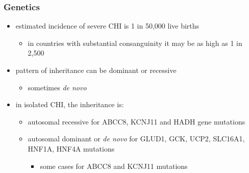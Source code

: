 \documentclass{scrartcl}
\begin{document}
\subsubsection{Genetics}
\label{sec:org6b7c493}
\begin{itemize}
\item estimated incidence of severe CHI is 1 in 50,000 live births
\begin{itemize}
\item in countries with substantial consanguinity it may be as high as 1 in 2,500
\end{itemize}
\item pattern of inheritance can be dominant or recessive
\begin{itemize}
\item sometimes \emph{de novo}
\end{itemize}
\item in isolated CHI, the inheritance is:
\begin{itemize}
\item autosomal recessive for ABCC8, KCNJ11 and HADH gene mutations
\item autosomal dominant or \emph{de novo} for GLUD1, GCK, UCP2, SLC16A1, HNF1A, HNF4A mutations
\begin{itemize}
\item some cases for ABCC8 and KCNJ11 mutations
\end{itemize}
\end{itemize}
\end{itemize}
\end{document}
